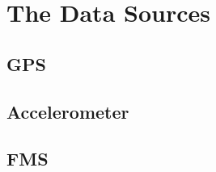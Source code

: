 \section{The Data Sources}

\subsection{GPS}
\subsection{Accelerometer}
\subsection{FMS}
\clearpage
